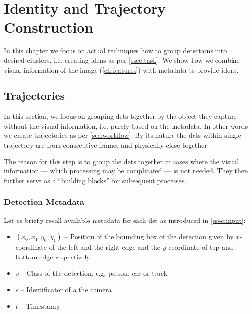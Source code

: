 \chapter{Identity and Trajectory Construction}


In this chapter we focus on actual techniques how to group detections into
desired clusters, i.e. creating \glspl{iden} as per \autoref{ssec:task}.
We show how we combine visual information of the image
(\autoref{ch:features}) with metadata to provide \glspl{iden}.

\section{Trajectories}

In this section, we focus on grouping \glspl{det} together by the object they
capture without the visual information, i.e. purely based on the metadata. In
other words we create trajectories as per \autoref{sec:workflow}. By its nature
the \glspl{det} within single trajectory are from consecutive frames and
physically close together.

The reason for this step is to group the \glspl{det} together in cases
where the visual information --- which processing may be complicated --- is not
needed. They then further serve as a ``building blocks'' for subsequent
processes.



\subsection{Detection Metadata}

Let us briefly recall available metadata for each \gls{det} as introduced in
\autoref{ssec:input}:

\begin{itemize}
    \item $(x_0, x_1, y_0, y_1)$ -- Position of the bounding box of the detection given by $x$-coordinate of the left and the right edge and the $y$-coordinate of top and bottom edge respectively.
    \item $v$ -- Class of the detection, e.g. person, car or truck
    \item $c$ -- Identificator of a the camera
    \item $t$ -- Timestamp
\end{itemize}


